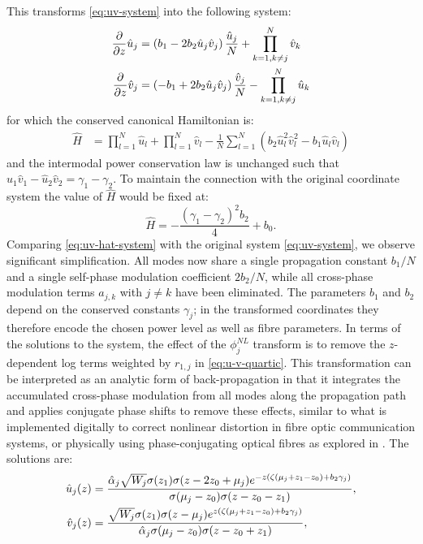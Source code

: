 \documentclass[11pt,a4paper]{article}
\numberwithin{equation}{section}
\begin{document}
This transforms \eqref{eq:uv-system} into the following system:
\begin{align}
\frac{\partial}{\partial z} \hat{u}_j &= \left(b_1 - 2 b_2\hat{u}_j \hat{v}_j \right) \frac{\hat{u}_j}{N} + \prod\limits_{k=1, k \ne j}^{N} \hat{v}_k \notag \\
\frac{\partial}{\partial z} \hat{v}_j &= \left( - b_1 + 2 b_2\hat{u}_j \hat{v}_j\right) \frac{\hat{v}_j}{N} - \prod\limits_{k=1, k \ne j}^{N} \hat{u}_k \label{eq:uv-hat-system}
\end{align}
for which the conserved canonical Hamiltonian is:
\begin{align}
\hat{H} &= \prod_{l=1}^{N} \hat{u}_l + \prod_{l=1}^{N} \hat{v}_l - \frac{1}{N}\sum_{l=1}^{N} \left(b_2 \hat{u}^{2}_l \hat{v}^{2}_l  - b_1 \hat{u}_l \hat{v}_l \right)
\end{align}
and the intermodal power conservation law is unchanged such that $\hat{u}_1 \hat{v}_1 - \hat{u}_2 \hat{v}_2 = \gamma_1 - \gamma_2$. 
To maintain the connection with the original coordinate system the value of $\hat{H}$ would be fixed at:
\begin{equation}
\hat{H} =  - \frac{\left({\gamma}_{1} - {\gamma}_{2}\right)^{2} {b}_{2}}{4} + {b}_{0}.
\end{equation}
Comparing \eqref{eq:uv-hat-system} with the original system \eqref{eq:uv-system}, we observe significant simplification.
All modes now share a single propagation constant $b_1/N$ and a single self-phase modulation coefficient $2b_2/N$, while all cross-phase modulation terms $a_{j,k}$ with $j \ne k$ have been eliminated.
The parameters $b_1$ and $b_2$ depend on the conserved constants $\gamma_j$; in the transformed coordinates they therefore encode the chosen power level as well as fibre parameters.
In terms of the solutions to the system, the effect of the $\phi_j^{NL}$ transform is to remove the $z$-dependent log terms weighted by $r_{1,j}$ in \eqref{eq:u-v-quartic}. 
This transformation can be interpreted as an analytic form of back-propagation in that it integrates the accumulated cross-phase modulation from all modes along the propagation path and applies conjugate phase shifts to remove these effects, similar to what is implemented digitally to correct nonlinear distortion in fibre optic communication systems, or physically using phase-conjugating optical fibres as explored in \cite{heskethMinimizingInterchannelCrossphase2016}.
The solutions are:
\begin{align}
\hat{u}_j{\left(z\right)} &= \frac{{\hat{\alpha}}_{j} \sqrt{W_j}\sigma{\left(z_{1}\right)} \sigma{\left(z - 2 z_{0} + {\mu}_{j}\right)} e^{-z\left(\zeta\left(\mu_j + z_1 - z_0\right) + b_2\gamma_j\right)} }{ \sigma{\left({\mu}_{j} - z_{0}\right)} \sigma{\left(z - z_{0} - z_{1}\right)}}, \notag \\
\hat{v}_j{\left(z\right)} &= \frac{\sqrt{W_j}\sigma{\left(z_{1}\right)} \sigma{\left(z - {\mu}_{j}\right)} e^{z\left(\zeta\left(\mu_j + z_1 - z_0\right) + b_2\gamma_j\right)}}{ {\hat{\alpha}}_{j} \sigma{\left({\mu}_{j} - z_{0}\right)} \sigma{\left(z - z_{0} + z_{1}\right)}}, \label{eq:uhat-vhat-gauge-sols}
\end{align}
\end{document}
